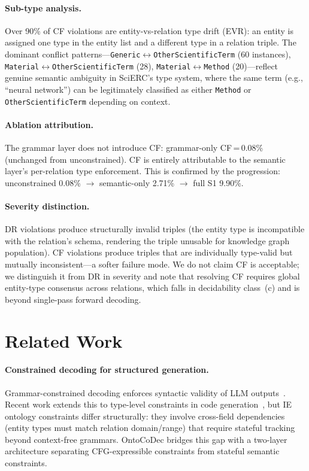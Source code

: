 \documentclass[11pt,a4paper]{article}
\newcommand{\sys}{OntoCoDec\xspace}
\begin{document}
\paragraph{Sub-type analysis.}
Over 90\% of CF violations are entity-vs-relation type drift (EVR): an entity is assigned one type in the entity list and a different type in a relation triple.
The dominant conflict patterns---\texttt{Generic}$\leftrightarrow$\texttt{OtherScientificTerm} (60 instances), \texttt{Material}$\leftrightarrow$\texttt{OtherScientificTerm} (28), \texttt{Material}$\leftrightarrow$\texttt{Method} (20)---reflect genuine semantic ambiguity in SciERC's type system, where the same term (e.g., ``neural network'') can be legitimately classified as either \texttt{Method} or \texttt{OtherScientificTerm} depending on context.

\paragraph{Ablation attribution.}
The grammar layer does not introduce CF: grammar-only CF\,=\,0.08\% (unchanged from unconstrained).
CF is entirely attributable to the semantic layer's per-relation type enforcement.
This is confirmed by the progression: unconstrained 0.08\% $\to$ semantic-only 2.71\% $\to$ full S1 9.90\%.

\paragraph{Severity distinction.}
DR violations produce structurally invalid triples (the entity type is incompatible with the relation's schema, rendering the triple unusable for knowledge graph population).
CF violations produce triples that are individually type-valid but mutually inconsistent---a softer failure mode.
We do not claim CF is acceptable; we distinguish it from DR in severity and note that resolving CF requires global entity-type consensus across relations, which falls in decidability class~(c) and is beyond single-pass forward decoding.

\section{Related Work}
\label{sec:related}

\paragraph{Constrained decoding for structured generation.}
Grammar-constrained decoding enforces syntactic validity of LLM outputs~\citep{willard2023efficient,dong2024xgrammar}.
Recent work extends this to type-level constraints in code generation~\citep{ugare2024pldi}, but IE ontology constraints differ structurally: they involve cross-field dependencies (entity types must match relation domain/range) that require stateful tracking beyond context-free grammars.
\sys bridges this gap with a two-layer architecture separating CFG-expressible constraints from stateful semantic constraints.
\end{document}
